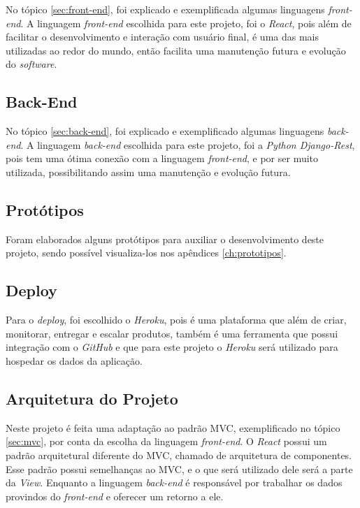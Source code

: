 No tópico \ref{sec:front-end}, foi explicado e exemplificada algumas linguagens \textit{front-end}. A linguagem \textit{front-end} escolhida para este projeto, foi o \textit{React}, pois além de facilitar o desenvolvimento e interação com usuário final, é uma das mais utilizadas ao redor do mundo, então facilita uma manutenção futura e evolução do \textit{software}.

\subsection{Back-End}

No tópico \ref{sec:back-end}, foi explicado e exemplificado algumas linguagens \textit{back-end}. A linguagem \textit{back-end} escolhida para este projeto, foi a \textit{Python Django-Rest}, pois tem uma ótima conexão com a linguagem \textit{front-end}, e por ser muito utilizada, possibilitando assim uma manutenção e evolução futura.

\subsection{Protótipos}

Foram elaborados alguns protótipos para auxiliar o desenvolvimento deste projeto, sendo possível visualiza-los nos apêndices \ref{ch:prototipos}.

\subsection{Deploy}

Para o \textit{deploy}, foi escolhido o \textit{Heroku}, pois é uma plataforma que além de criar, monitorar, entregar e escalar produtos, também é uma ferramenta que possui integração com o \textit{GitHub} e que para este projeto o \textit{Heroku} será utilizado para hospedar os dados da aplicação.  

\subsection{Arquitetura do Projeto}

Neste projeto é feita uma adaptação ao padrão MVC, exemplificado no tópico \ref{sec:mvc}, por conta da escolha da linguagem \textit{front-end}. O \textit{React} possui um padrão arquitetural diferente do MVC, chamado de arquitetura de componentes. Esse padrão possui semelhanças ao MVC, e o que será utilizado dele será a parte da \textit{View}. Enquanto a linguagem \textit{back-end} é responsável por trabalhar os dados provindos do \textit{front-end} e oferecer um retorno a ele. 

